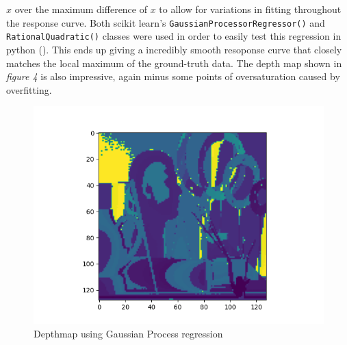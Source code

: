 \documentclass[letterpaper,12pt]{article}
\begin{document}
$x$ over the maximum difference of $x$ to allow for variations in fitting throughout the 
response curve. Both scikit learn's \verb|GaussianProcessorRegressor()| and 
\verb|RationalQuadratic()| classes were used in order to easily test this regression in python 
(\cite{scikit-learn}). This ends up giving a incredibly smooth resoponse curve that closely 
matches the local maximum of the ground-truth data. The depth map shown in \emph{figure 4} 
is also impressive, again minus some points of oversaturation caused by overfitting.
\begin{figure}[H]
\centering
\includegraphics{gaussian_depthmap}
\caption{Depthmap using Gaussian Process regression}
\end{figure}
\end{document}
